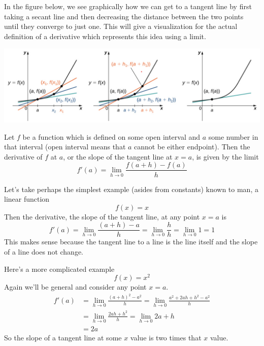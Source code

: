 In the figure below, we see graphically how we can get to a tangent line by first taking a secant line and then decreasing the distance between the two points until they converge to just one. This will give a visualization for the actual definition of a derivative which represents this idea using a limit.

\begin{center}
	\includegraphics[scale=0.55]{images/Figure 3.1.1.png}
\end{center}

\begin{definition}[Derivatives]
	Let $f$ be a function which is defined on some open interval and $a$ some number in that interval (open interval means that $a$ cannot be either endpoint). Then the derivative of $f$ at $a$, or the slope of the tangent line at $x = a$, is given by the limit
	\[ f'(a) = \lim_{h \to 0} \frac{f(a + h) - f(a)}{h} \] 
\end{definition}

\begin{example}
	Let's take perhaps the simplest example (asides from constants) known to man, a linear function
	\[ f(x) = x \]
	Then the derivative, the slope of the tangent line, at any point $x = a$ is
	\[ f'(a) = \lim_{h \to 0} \frac{(a + h) - a}{h} = \lim_{h \to 0} \frac{h}{h} = \lim_{h \to 0} 1 = 1 \]
	This makes sense because the tangent line to a line is the line itself and the slope of a line does not change.
\end{example}

\begin{example}
	Here's a more complicated example
	\[ f(x) = x^2 \]
	Again we'll be general and consider any point $x = a$.
	\begin{align*}
		f'(a) &= \lim_{h \to 0} \frac{(a + h)^2 - a^2}{h} = \lim_{h \to 0} \frac{a^2 + 2ah + h^2 - a^2}{h} \\
		&= \lim_{h \to 0} \frac{2ah + h^2}{h} = \lim_{h \to 0} 2a + h \\
		&= 2a
	\end{align*}
	So the slope of a tangent line at some $x$ value is two times that $x$ value.
\end{example}


